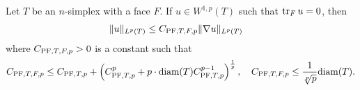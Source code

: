 \documentclass[12pt,a4paper]{article}
\begin{document}
\begin{lemma}\label{lemma:mixedbconsimplex}
    Let $T$ be an $n$-simplex with a face $F$. 
    If $u \in W^{1,p}(T)$ such that $\operatorname{tr}_{F} u = 0$, then 
    \begin{align*}
        \| u \|_{L^{p}(T)}
        &
        \leq 
        C_{{\rm PF},T,F,p} \| \nabla u \|_{L^{p}(T)}
    \end{align*}
    where $C_{{\rm PF},T,F,p} > 0$ is a constant such that 
    \begin{align*}
        C_{{\rm PF},T,F,p}
        \leq 
        C_{{\rm PF},T,p} + \left( C_{{\rm PF},T,p}^{p} + p \cdot {\operatorname{diam}}(T) C_{{\rm PF},T,p}^{p-1} \right)^{\frac 1 p},  
        \quad 
        C_{{\rm PF},T,F,p}
        \leq
        \frac{1}{\sqrt[p]{p}}
        {\operatorname{diam}}(T)
        .
    \end{align*}
\end{lemma}
\end{document}
